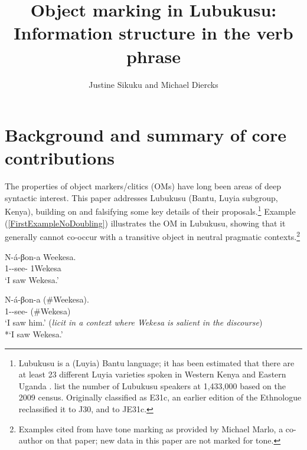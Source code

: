 \documentclass[output=paper]{langscibook}
\author{Justine Sikuku\affiliation{Moi University} and Michael Diercks\affiliation{Pomona College}}
\title{Object marking in Lubukusu: Information structure in the verb phrase}
\begin{document}
\maketitle

\section{Background and summary of core contributions}

The properties of object markers/clitics (OMs) have long been areas of deep syntactic interest. This paper addresses Lubukusu (Bantu, Luyia subgroup, Kenya), building on \citet*{SikukuEtAl:2018:LubukusuOM} and falsifying some key details of their proposals.\footnote{Lubukusu is a (Luyia) Bantu language; it has been estimated that there are at least 23 different Luyia varieties spoken in Western Kenya and Eastern Uganda \citep{Marlo:2009:LuyiaTonalDialects}. \citet{Lewis:2016:Ethnologue} list the number of Lubukusu speakers at 1,433,000 based on the 2009 census. Originally classified as E31c, an earlier edition of the Ethnologue reclassified it to J30, and \citet{Maho:2008:GuthrieUpdate} to JE31c.} Example (\ref{FirstExampleNoDoubling}) illustrates the OM in Lubukusu, showing that it generally cannot co-occur with a transitive object in neutral pragmatic contexts.\footnote{Examples cited from \citet{SikukuEtAl:2018:LubukusuOM} have tone marking as provided by Michael Marlo, a co-author on that paper; new data in this paper are not marked for tone.}

\begin{exe}  \ex \label{FirstExample}
\begin{xlist}
\ex \label{FirstExampleNoOM}
\gll N-á-βon-a	Weekesa.	\\	
1\Sm-\Pst-see-\Fv{} 1Wekesa \\ 
\glt `I saw Wekesa.’ \citep[360]{SikukuEtAl:2018:LubukusuOM}

\ex \label{FirstExampleNoDoubling}
\gll N-á-βon-a	(\#Weekesa).	\\
1\Sm-\Om-see-\Fv{} (\#Wekesa) \\ 
\glt `I saw him.’  (\textit{licit in a context where Wekesa is salient in the discourse})\\
*`I saw Wekesa.' \citep[360]{SikukuEtAl:2018:LubukusuOM}
\end{xlist}
\end{exe}
\end{document}
